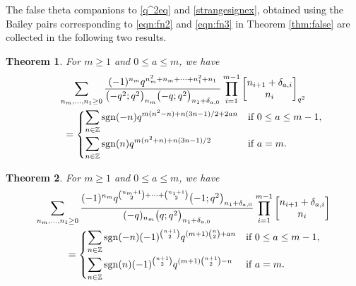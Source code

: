 \documentclass[pdftex]{sigma}
\newtheorem{Theorem}{Theorem}[section]
\numberwithin{equation}{section}
\begin{document}
The false theta companions to \eqref{q^2eq} and \eqref{strangesignex}, obtained using the Bailey pairs corresponding to \eqref{eqn:fn2} and \eqref{eqn:fn3} in Theorem \ref{thm:false} are collected in the following two results.
\begin{Theorem} \label{thm:falseq^2}
For $m \geq 1$ and $0 \leq a \leq m$, we have
\begin{gather*}
		\sum_{n_m,\dots ,n_1 \geq 0} \frac{(-1)^{n_m}q^{n_m^2+n_m + \cdots + n_1^2+n_1}}{\bigl(-q^2;q^2\bigr)_{n_m} \bigl(-q;q^2\bigr)_{n_1 + \delta_{a,0}}} \prod_{i=1}^{m-1} \begin{bmatrix} n_{i+1} + \delta_{a,i} \\ n_i \end{bmatrix}_{q^2} \\
		\qquad{}=
		\begin{cases}
			\displaystyle \sum_{n \in \mathbb{Z}} {\rm sgn}(-n)q^{m(n^2-n) + n(3n-1)/2 +2an} &\text{if $0 \leq a \leq m-1$}, \vspace{1mm}\\
			\displaystyle \sum_{n \in \mathbb{Z}} {\rm sgn}(n)q^{m(n^2+n) + n(3n-1)/2} & \text{if $a=m$.}
		\end{cases}
\end{gather*}
\end{Theorem}

\begin{Theorem} \label{thm:falsestrangesign}
For $m \geq 1$ and $0 \leq a \leq m$, we have
\begin{gather*}
		\sum_{n_m, \dots, n_1 \geq 0} \frac{(-1)^{n_m}q^{\binom{n_m + 1}{2} + \cdots + \binom{n_1+1}{2}}\bigl(-1;q^2\bigr)_{n_1 + \delta_{a,0}}}{(-q)_{n_m}\bigl(q;q^2\bigr)_{n_1+ \delta_{a,0}}} \prod_{i=1}^{m-1} \begin{bmatrix} n_{i+1} + \delta_{a,i} \\ n_i \end{bmatrix} \\
		\qquad{}=
		\begin{cases}
			\displaystyle \sum_{n \in \mathbb{Z}} {\rm sgn}(-n)(-1)^{\binom{n+1}{2}} q^{(m+1)\binom{n}{2} + an} & \text{if $0 \leq a \leq m-1$}, \vspace{1mm}\\
			\displaystyle \sum_{n \in \mathbb{Z}} {\rm sgn}(n)(-1)^{\binom{n+1}{2}} q^{(m+1)\binom{n+1}{2}-n} & \text{if $a=m$}.
		\end{cases}
	\end{gather*}
\end{Theorem}
\end{document}
